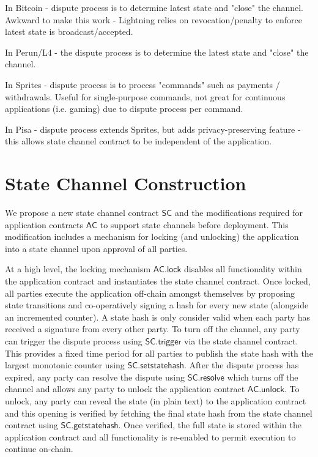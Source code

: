 \documentclass{article}
\newcommand{\statechannel}{\mathsf{SC}}
\newcommand{\statechanneldispute}{\mathsf{SC}.\mathsf{trigger}}
\newcommand{\statechannelsetstate}{\mathsf{SC}.\mathsf{setstatehash}}
\newcommand{\statechannelresolve}{\mathsf{SC}.\mathsf{resolve}}
\newcommand{\statechannelgetcommitment}{\mathsf{SC}.\mathsf{getstatehash}}
\newcommand{\appcontract}{\mathsf{AC}}
\newcommand{\applock}{\mathsf{AC.lock}}
\newcommand{\appunlock}{\mathsf{AC.unlock}}
\begin{document}
In Bitcoin - dispute process is to determine latest state and "close" the channel. Awkward to make this work - Lightning relies on revocation/penalty to enforce latest state is broadcast/accepted. 

In Perun/L4 - the dispute process is to determine the latest state and "close" the channel. 

In Sprites - dispute process is to process "commands" such as payments / withdrawals. Useful for single-purpose commands, not great for continuous applications (i.e. gaming) due to dispute process per command.

In Pisa - dispute process extends Sprites, but adds privacy-preserving feature - this allows state channel contract to be independent of the application. 

\section{State Channel Construction} 

We propose a new state channel contract $\statechannel$ and the modifications required for  application contracts $\appcontract$  to support state channels before deployment. 
This modification includes a mechanism for locking (and unlocking) the application into a state channel upon approval of all parties. 

At a high level, the locking mechanism $\applock$ disables all functionality within the application contract and instantiates the state channel contract. 
Once locked, all parties execute the application off-chain amongst themselves by proposing state transitions and co-operatively signing a hash for every new state (alongside an incremented counter). 
A state hash is only consider valid when each party has received a signature from every other party. 
To turn off the channel, any party can trigger the dispute process using $\statechanneldispute$ via the state channel contract.
This provides  a fixed time period  for all parties to publish the state hash with the largest monotonic counter using $\statechannelsetstate$. 
After the dispute process has expired, any party can resolve the dispute using $\statechannelresolve$ which turns off the channel and allows any party to unlock the application contract $\appunlock$. 
To unlock, any party can reveal the state (in plain text) to the application contract and this opening is verified by fetching the final state hash from the state channel contract using  $\statechannelgetcommitment$. 
Once verified, the full state is stored within the application contract and all functionality is re-enabled to permit execution to continue on-chain. 
\end{document}

